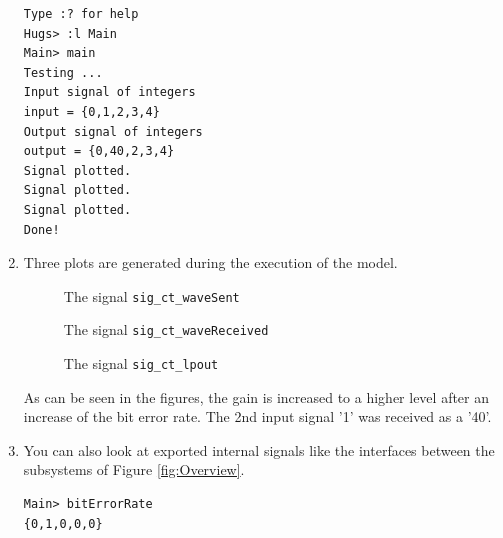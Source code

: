 \begin{enumerate}
\begin{verbatim}
Type :? for help
Hugs> :l Main
Main> main
Testing ...
Input signal of integers
input = {0,1,2,3,4}
Output signal of integers
output = {0,40,2,3,4}
Signal plotted.
Signal plotted.
Signal plotted.
Done!
\end{verbatim}

\item Three plots are generated during the execution of the model.

\begin{figure}[htb!]
\centering%
\caption{The signal \texttt{sig\_ct\_waveSent}}
\label{fig:ASK}
\end{figure}

\begin{figure}[htb!]
\centering%
\caption{The signal \texttt{sig\_ct\_waveReceived}}
\label{fig:NoisyASK}
\end{figure}

\begin{figure}[htb!]
\centering%
\caption{The signal \texttt{sig\_ct\_lpout}}
\label{fig:FilteredNoisyASK}
\end{figure}
As can be seen in the figures, the gain is increased to a higher level after an increase of the bit error rate. The 2nd input signal '1' was received as a '40'. 
\item You can also look at exported internal signals like the interfaces between the subsystems of Figure \ref{fig:Overview}.
\begin{verbatim}
Main> bitErrorRate
{0,1,0,0,0}
\end{verbatim}
\end{enumerate}




